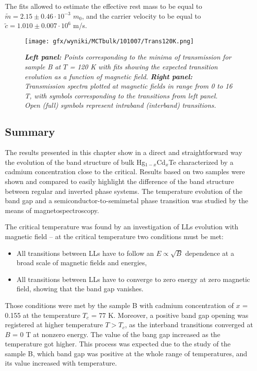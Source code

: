 \documentclass[titlepage,a4paper]{book}
\begin{document}
The fits allowed to estimate the effective rest mass to be equal to $\tilde m = 2.15 \pm 0.46 \cdot 10^{-3}$ $m_0$, and the carrier velocity to be equal to $\tilde{c} = 1.010 \pm 0.007 \cdot 10^6$ m/s.

\clearpage
\begin{figure}[H]
	\centering
	\texttt{[image: gfx/wyniki/MCTbulk/101007/Trans120K.png]}
	\vspace{-10pt}
	\caption{\textit{\textbf{Left panel:} Points corresponding to the minima of transmission for sample B at $T$ = 120 K with fits showing the expected transition evolution as a function of magnetic field. \textbf{Right panel:} Transmission spectra plotted at magnetic fields in range from 0 to 16 T, with symbols corresponding to the transitions from left panel. Open (full) symbols represent intraband (interband) transitions.}}
	\label{fig:Spectra_101007_120K}
\end{figure}


\subsection{Summary}
The results presented in this chapter show in a direct and straightforward way the evolution of the band structure of bulk Hg$_{1-x}$Cd$_{x}$Te characterized by a cadmium concentration close to the critical. Results based on two samples were shown and compared to easily highlight the difference of the band structure between regular and inverted phase systems. The temperature evolution of the band gap and a semiconductor-to-semimetal phase transition was studied by the means of magnetospectroscopy. 

The critical temperature was found by an investigation of LLs evolution with magnetic field -- at the critical temperature two conditions must be met: 
\begin{itemize}
\item All transitions between LLs have to follow an $E \propto \sqrt{B}$ dependence at a broad scale of magnetic fields and energies,
\item All transitions between LLs have to converge to zero energy at zero magnetic field, showing that the band gap vanishes.
\end{itemize}

Those conditions were met by the sample B with cadmium concentration of $x$ = 0.155 at the temperature $T_c$ = 77 K. Moreover, a positive band gap opening was registered at higher temperature $T > T_c$, as the interband transitions converged at $B$ = 0 T at nonzero energy. The value of the bang gap increased as the temperature got higher. This process was expected due to the study of the sample B, which band gap was positive at the whole range of temperatures, and its value increased with temperature.  
\end{document}
